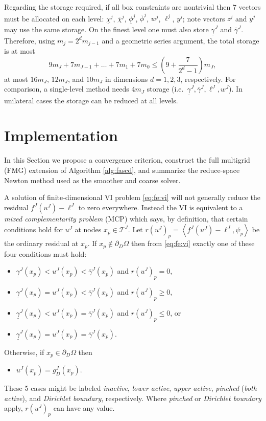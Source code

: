 \documentclass[review,hidelinks,onefignum,onetabnum,final]{siamart220329}  %
\newcommand{\ip}[2]{\left<#1,#2\right>}
\begin{document}
Regarding the storage required, if all box constraints are nontrivial then 7 vectors must be allocated on each level: $\underline{\chi}^j$, $\overline{\chi}^j$, $\underline{\phi}^j$, $\overline{\phi}^j$, $w^j$, $\ell^j$, $y^j$; note vectors $z^j$ and $y^j$ may use the same storage.  On the finest level one must also store $\underline{\gamma}^J$ and $\overline{\gamma}^J$.  Therefore, using $m_j=2^d m_{j-1}$ and a geometric series argument, the total storage is at most
\begin{equation}
9 m_J + 7 m_{J-1} + \dots + 7 m_1 + 7 m_0 \le \left(9 + \frac{7}{2^d - 1}\right) m_J,
\end{equation}
at most $16m_J$, $12m_J$, and $10m_J$ in dimensions $d=1,2,3$, respectively.  For comparison, a single-level method needs $4 m_J$ storage (i.e.~$\underline{\gamma}^J,\overline{\gamma}^J,\ell^J,w^J$).  In unilateral cases the storage can be reduced at all levels.


\section{Implementation} \label{sec:implementation}

In this Section we propose a convergence criterion, construct the full multigrid (FMG) extension of Algorithm \ref{alg:fascd}, and summarize the reduce-space Newton method used as the smoother and coarse solver.

A solution of finite-dimensional VI problem \eqref{eq:fe:vi} will not generally reduce the residual $f^J(u^J) - \ell^J$ to zero everywhere.  Instead the VI is equivalent to a \emph{mixed complementarity problem} (MCP) \cite{FacchineiPang2003} which says, by definition, that certain conditions hold for $u^J$ at nodes $x_p \in \mathcal{T}^J$.  Let $r(u^J)_p = \ip{f^J(u^J)-\ell^J}{\psi_p}$ be the ordinary residual at $x_p$.  If $x_p \notin \partial_D\Omega$ then from \eqref{eq:fe:vi} exactly one of these four conditions must hold:
\begin{itemize}
\item $\underline{\gamma}^J(x_p)<u^J(x_p)<\overline{\gamma}^J(x_p)$ and $r(u^J)_p = 0$,
\item $\underline{\gamma}^J(x_p)=u^J(x_p)<\overline{\gamma}^J(x_p)$ and $r(u^J)_p \ge 0$,
\item $\underline{\gamma}^J(x_p)<u^J(x_p)=\overline{\gamma}^J(x_p)$ and $r(u^J)_p \le 0$, or
\item $\underline{\gamma}^J(x_p)=u^J(x_p)=\overline{\gamma}^J(x_p)$.
\end{itemize}
Otherwise, if $x_p \in \partial_D\Omega$ then
\begin{itemize}
\item $u^J(x_p)=g_D^J(x_p)$.
\end{itemize}
These 5 cases might be labeled \emph{inactive}, \emph{lower active}, \emph{upper active}, \emph{pinched} (\emph{both active}), and \emph{Dirichlet boundary}, respectively.  Where \emph{pinched} or \emph{Dirichlet boundary} apply, $r(u^J)_p$ can have any value.
\end{document}
